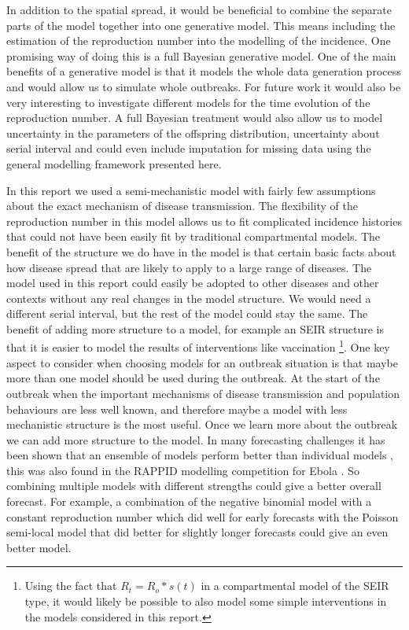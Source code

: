 \documentclass[12pt]{article}
\begin{document}
In addition to the spatial spread, it would be beneficial to combine the separate parts of the model together into one generative model. This means including the estimation of the reproduction number into the modelling of the incidence. One promising way of doing this is a full Bayesian generative model. One of the main benefits of a generative model is that it models the whole data generation process and would allow us to simulate whole outbreaks. For future work it would also be very interesting to investigate different models for the time evolution of the reproduction number. A full Bayesian treatment would also allow us to model uncertainty in the parameters of the offspring distribution, uncertainty about serial interval and could even include imputation for missing data using the general modelling framework presented here.

In this report we used a semi-mechanistic model with fairly few assumptions about the exact mechanism of disease transmission. The flexibility of the reproduction number in this model allows us to fit complicated incidence histories that could not have been easily fit by traditional compartmental models. The benefit of the structure we do have in the model is that certain basic facts about how disease spread that are likely to apply to a large range of diseases. The model used in this report could easily be adopted to other diseases and other contexts without any real changes in the model structure. We would need a different serial interval, but the rest of the model could stay the same. The benefit of adding more structure to a model, for example an SEIR structure is that it is easier to model the results of interventions like vaccination \footnote{Using the fact that $R_t=R_o*s(t)$ in a compartmental model of the SEIR type, it would likely be possible to also model some simple interventions in the models considered in this report.}. One key aspect to consider when choosing models for an outbreak situation is that maybe more than one model should be used during the outbreak. At the start of the outbreak when the important mechanisms of disease transmission and population behaviours are less well known, and therefore maybe a model with less mechanistic structure is the most useful. Once we learn more about the outbreak we can add more structure to the model. In many forecasting challenges it has been shown that an ensemble of models perform better than individual models \cite{dietterichEnsembleMethodsMachine2000}, this was also found in the RAPPID modelling competition for Ebola \cite{viboudRAPIDDEbolaForecasting2018}. So combining multiple models with different strengths could give a better overall forecast. For example, a combination of the negative binomial model with a constant reproduction number which did well for early forecasts with the Poisson semi-local model that did better for slightly longer forecasts could give an even better model.
\end{document}
